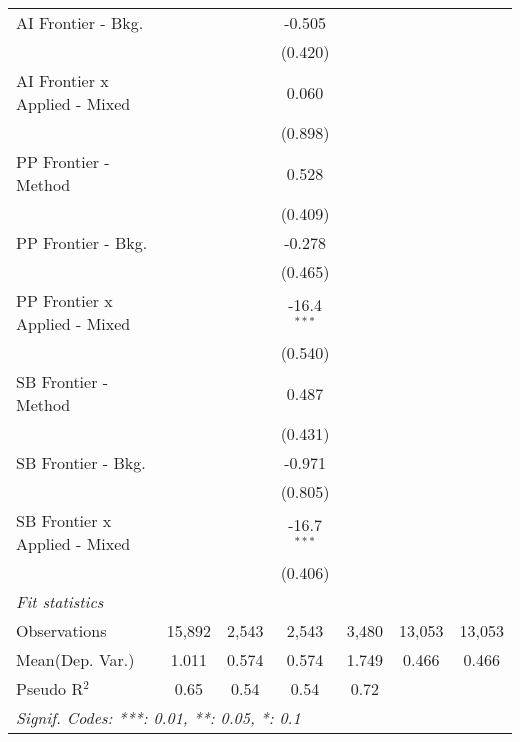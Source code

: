 \begin{tabular}{lcccccc}
   AI Frontier - Bkg.            &               &               & -0.505        &              &        &   \\   
                                 &               &               & (0.420)       &              &        &   \\   
   AI Frontier x Applied - Mixed &               &               & 0.060         &              &        &   \\   
                                 &               &               & (0.898)       &              &        &   \\   
   PP Frontier - Method          &               &               & 0.528         &              &        &   \\   
                                 &               &               & (0.409)       &              &        &   \\   
   PP Frontier - Bkg.            &               &               & -0.278        &              &        &   \\   
                                 &               &               & (0.465)       &              &        &   \\   
   PP Frontier x Applied - Mixed &               &               & -16.4$^{***}$ &              &        &   \\   
                                 &               &               & (0.540)       &              &        &   \\   
   SB Frontier - Method          &               &               & 0.487         &              &        &   \\   
                                 &               &               & (0.431)       &              &        &   \\   
   SB Frontier - Bkg.            &               &               & -0.971        &              &        &   \\   
                                 &               &               & (0.805)       &              &        &   \\   
   SB Frontier x Applied - Mixed &               &               & -16.7$^{***}$ &              &        &   \\   
                                 &               &               & (0.406)       &              &        &   \\   
   \midrule
   \emph{Fit statistics}\\
   Observations                  & 15,892        & 2,543         & 2,543         & 3,480        & 13,053 & 13,053\\  
Mean(Dep. Var.) & 1.011 & 0.574 & 0.574 & 1.749 & 0.466 & 0.466 \\
   Pseudo R$^2$                  & 0.65          & 0.54          & 0.54          & 0.72         &        & \\  
   \midrule \midrule
   \multicolumn{7}{l}{\emph{Signif. Codes: ***: 0.01, **: 0.05, *: 0.1}}\\
\end{tabular}
\par\endgroup
